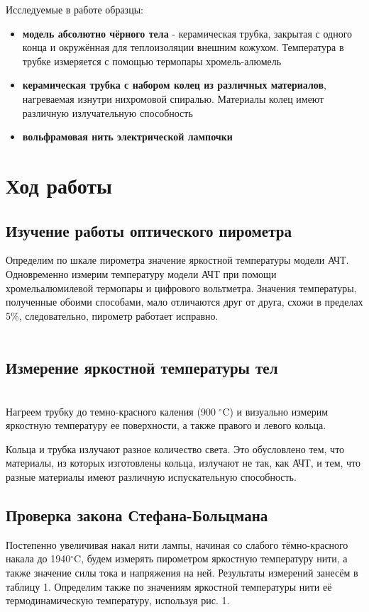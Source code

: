 \documentclass[a4paper]{article}
\begin{document}
Исследуемые в работе образцы:
\begin{itemize}
    \item \textbf{модель абсолютно чёрного тела} - керамическая трубка, закрытая с одного конца и окружённая для теплоизоляции внешним кожухом. Температура в трубке измеряется с помощью термопары хромель-алюмель
    \item \textbf{керамическая трубка с набором колец из различных материалов}, нагреваемая изнутри нихромовой спиралью. Материалы колец имеют различную излучательную способность
    \item \textbf{вольфрамовая нить электрической лампочки}
\end{itemize}

\newpage

\section{Ход работы}
\subsection{Изучение работы оптического пирометра}

Определим по шкале пирометра значение яркостной температуры модели АЧТ. Одновременно измерим температуру модели АЧТ при помощи хромельалюмилевой термопары и цифрового вольтметра.
Значения температуры, полученные обоими способами, мало отличаются друг от друга, схожи в пределах 5\%, следовательно, пирометр работает исправно. \\\\
\subsection{Измерение яркостной температуры тел}\\
Нагреем трубку до темно-красного каления (900 $^\circ$C) и визуально измерим яркостную температуру ее поверхности, а также правого и левого кольца.

Кольца и трубка излучают разное количество света. Это обусловлено тем, что материалы, из которых изготовлены кольца, излучают не так, как АЧТ, и тем, что разные материалы имеют различную испускательную способность.

\newpage
\subsection{Проверка закона Стефана-Больцмана}
    \par Постепенно увеличивая накал нити лампы, начиная со слабого тёмно-красного накала до 1940$^{\circ}$C, будем измерять пирометром яркостную температуру нити, а также значение силы тока и напряжения на ней. Результаты измерений занесём в таблицу 1. Определим также по значениям яркостной температуры нити её термодинамическую температуру, используя рис. 1.
    
\end{document}
